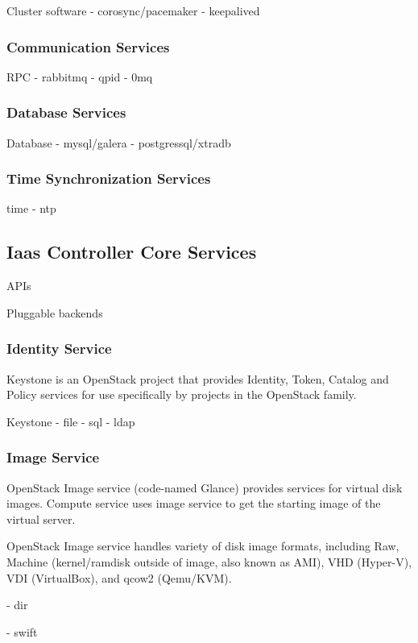 Cluster software
- corosync/pacemaker
- keepalived

\subsubsection{Communication Services}

RPC
- rabbitmq
- qpid
- 0mq

\subsubsection{Database Services}

Database
- mysql/galera
- postgressql/xtradb

\subsubsection{Time Synchronization Services}

time
- ntp

\subsection{Iaas Controller Core Services}

APIs

Pluggable backends

\subsubsection{Identity Service}

Keystone is an OpenStack project that provides Identity, Token, Catalog and Policy services for use specifically by projects in the OpenStack family.

Keystone
- file
- sql	
- ldap

\subsubsection{Image Service}

OpenStack Image service (code-named Glance) provides services for virtual disk images. Compute service uses image service to get the starting image of the virtual server.

OpenStack Image service handles variety of disk image formats, including Raw, Machine (kernel/ramdisk outside of image, also known as AMI), VHD (Hyper-V), VDI (VirtualBox), and qcow2 (Qemu/KVM).

- dir

- swift

